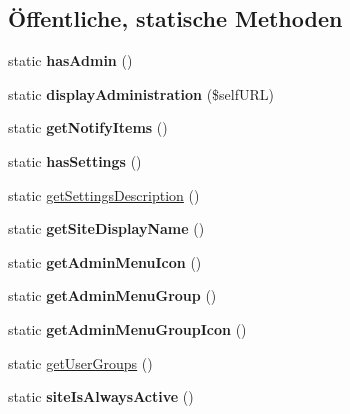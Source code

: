 \subsection*{Öffentliche, statische Methoden}
\begin{DoxyCompactItemize}
\item 
\mbox{\label{classchangeuseridinsession_a600ea2d3e8f23398699b31f90e9ca42e}} 
static {\bfseries has\+Admin} ()
\item 
\mbox{\label{classchangeuseridinsession_a8690b1539de52a6622650d3b44f82144}} 
static {\bfseries display\+Administration} (\$self\+U\+RL)
\item 
\mbox{\label{classchangeuseridinsession_a1887cc8fe18eac25a66ab4b94570fe8e}} 
static {\bfseries get\+Notify\+Items} ()
\item 
\mbox{\label{classchangeuseridinsession_a01a8da490d712be80636c9e83db45bed}} 
static {\bfseries has\+Settings} ()
\item 
static \mbox{\hyperlink{classchangeuseridinsession_ab7adbdcd171a28a9ce89cd8e76aea03d}{get\+Settings\+Description}} ()
\item 
\mbox{\label{classchangeuseridinsession_acbdceed7a673fab143f164695bc27169}} 
static {\bfseries get\+Site\+Display\+Name} ()
\item 
\mbox{\label{classchangeuseridinsession_ad50c51e191e8424fa921c55c42e8dea2}} 
static {\bfseries get\+Admin\+Menu\+Icon} ()
\item 
\mbox{\label{classchangeuseridinsession_a0ad0b8ce702e0067eab0f2672b29391a}} 
static {\bfseries get\+Admin\+Menu\+Group} ()
\item 
\mbox{\label{classchangeuseridinsession_a9866b4da696b230602397467c26dc947}} 
static {\bfseries get\+Admin\+Menu\+Group\+Icon} ()
\item 
static \mbox{\hyperlink{classchangeuseridinsession_a9fe965ff939e53d54cb20df900b18b10}{get\+User\+Groups}} ()
\item 
\mbox{\label{classchangeuseridinsession_aded652b8cf4af316198ccb7985a2c1bb}} 
static {\bfseries site\+Is\+Always\+Active} ()
\end{DoxyCompactItemize}
